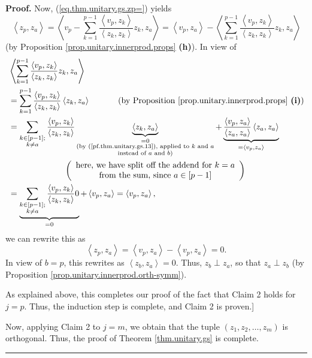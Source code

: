 \documentclass[numbers=enddot,12pt,final,onecolumn,notitlepage]{scrartcl}%
\numberwithin{exer}{subsection}
\theoremstyle{definition}
\newenvironment{proof}[1][Proof]{\noindent\textbf{#1.} }{\ \rule{0.5em}{0.5em}}
\let\sumnonlimits\sum
\renewcommand{\sum}{\sumnonlimits\limits}
\begin{document}
\begin{proof}
Now, (\ref{eq.thm.unitary.gs.zp=}) yields%
\[
\left\langle z_{p},z_{a}\right\rangle =\left\langle v_{p}-\sum_{k=1}%
^{p-1}\dfrac{\left\langle v_{p},z_{k}\right\rangle }{\left\langle z_{k}%
,z_{k}\right\rangle }z_{k},z_{a}\right\rangle =\left\langle v_{p}%
,z_{a}\right\rangle -\left\langle \sum_{k=1}^{p-1}\dfrac{\left\langle
v_{p},z_{k}\right\rangle }{\left\langle z_{k},z_{k}\right\rangle }z_{k}%
,z_{a}\right\rangle
\]
(by Proposition \ref{prop.unitary.innerprod.props} \textbf{(h)}). In view of%
\begin{align*}
&  \left\langle \sum_{k=1}^{p-1}\dfrac{\left\langle v_{p},z_{k}\right\rangle
}{\left\langle z_{k},z_{k}\right\rangle }z_{k},z_{a}\right\rangle \\
&  =\sum_{k=1}^{p-1}\dfrac{\left\langle v_{p},z_{k}\right\rangle
}{\left\langle z_{k},z_{k}\right\rangle }\left\langle z_{k},z_{a}\right\rangle
\ \ \ \ \ \ \ \ \ \ \left(  \text{by Proposition
\ref{prop.unitary.innerprod.props} \textbf{(i)}}\right) \\
&  =\sum_{\substack{k\in\left[  p-1\right]  ;\\k\neq a}}\dfrac{\left\langle
v_{p},z_{k}\right\rangle }{\left\langle z_{k},z_{k}\right\rangle
}\underbrace{\left\langle z_{k},z_{a}\right\rangle }_{\substack{=0\\\text{(by
(\ref{pf.thm.unitary.gs.13}), applied to }k\text{ and }a\\\text{instead of
}a\text{ and }b\text{)}}}+\underbrace{\dfrac{\left\langle v_{p},z_{a}%
\right\rangle }{\left\langle z_{a},z_{a}\right\rangle }\left\langle
z_{a},z_{a}\right\rangle }_{=\left\langle v_{p},z_{a}\right\rangle }\\
&  \ \ \ \ \ \ \ \ \ \ \ \ \ \ \ \ \ \ \ \ \left(
\begin{array}
[c]{c}%
\text{here, we have split off the addend for }k=a\\
\text{from the sum, since }a\in\left[  p-1\right]
\end{array}
\right) \\
&  =\underbrace{\sum_{\substack{k\in\left[  p-1\right]  ;\\k\neq a}%
}\dfrac{\left\langle v_{p},z_{k}\right\rangle }{\left\langle z_{k}%
,z_{k}\right\rangle }0}_{=0}+\left\langle v_{p},z_{a}\right\rangle
=\left\langle v_{p},z_{a}\right\rangle ,
\end{align*}
we can rewrite this as%
\[
\left\langle z_{p},z_{a}\right\rangle =\left\langle v_{p},z_{a}\right\rangle
-\left\langle v_{p},z_{a}\right\rangle =0.
\]
In view of $b=p$, this rewrites as $\left\langle z_{b},z_{a}\right\rangle =0$.
Thus, $z_{b}\perp z_{a}$, so that $z_{a}\perp z_{b}$ (by Proposition
\ref{prop.unitary.innerprod.orth-symm}).

As explained above, this completes our proof of the fact that Claim 2 holds
for $j=p$. Thus, the induction step is complete, and Claim 2 is proven.]
\medskip

Now, applying Claim 2 to $j=m$, we obtain that the tuple $\left(  z_{1}%
,z_{2},\ldots,z_{m}\right)  $ is orthogonal. Thus, the proof of Theorem
\ref{thm.unitary.gs} is complete.
\end{proof}
\end{document}
